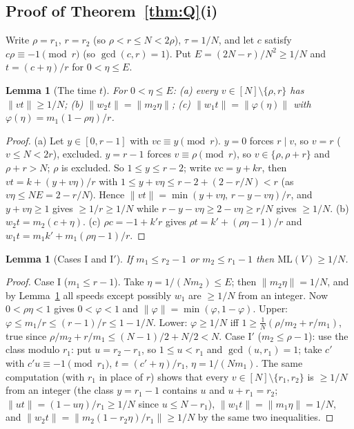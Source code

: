 \documentclass[11pt]{article}
\newtheorem{lemma}[theorem]{Lemma}
\theoremstyle{definition}
\theoremstyle{remark}
\newcommand{\nd}[1]{\lVert #1\rVert}
\newcommand{\ML}{\mathrm{ML}}
\begin{document}
\subsection{Proof of Theorem~\ref{thm:Q}(i)}
Write $\rho=r_1$, $r=r_2$ (so $\rho<r\le N<2\rho$), $\tau=1/N$, and let $c$ satisfy $c\rho\equiv-1\pmod r$ (so $\gcd(c,r)=1$). Put $E=(2N-r)/N^2\ge1/N$ and $t=(c+\eta)/r$ for $0<\eta\le E$.

\begin{lemma}[The time $t$]\label{lem:time}
For $0<\eta\le E$: (a) every $v\in[N]\setminus\{\rho,r\}$ has $\nd{vt}\ge1/N$; (b) $\nd{w_2t}=\nd{m_2\eta}$; (c) $\nd{w_1t}=\nd{\varphi(\eta)}$ with $\varphi(\eta)=m_1(1-\rho\eta)/r$.
\end{lemma}
\begin{proof}
(a) Let $y\in[0,r-1]$ with $vc\equiv y\pmod r$. $y=0$ forces $r\mid v$, so $v=r$ ($v\le N<2r$), excluded. $y=r-1$ forces $v\equiv\rho\pmod r$, so $v\in\{\rho,\rho+r\}$ and $\rho+r>N$; $\rho$ is excluded. So $1\le y\le r-2$; write $vc=y+kr$, then $vt=k+(y+v\eta)/r$ with $1\le y+v\eta\le r-2+(2-r/N)<r$ (as $v\eta\le NE=2-r/N$). Hence $\nd{vt}=\min(y+v\eta,\,r-y-v\eta)/r$, and $y+v\eta\ge1$ gives $\ge1/r\ge1/N$ while $r-y-v\eta\ge2-v\eta\ge r/N$ gives $\ge1/N$. (b) $w_2t=m_2(c+\eta)$. (c) $\rho c=-1+k'r$ gives $\rho t=k'+(\rho\eta-1)/r$ and $w_1t=m_1k'+m_1(\rho\eta-1)/r$.
\end{proof}

\begin{lemma}[Cases I and I$'$]\label{lem:caseI}
If $m_1\le r_2-1$ or $m_2\le r_1-1$ then $\ML(V)\ge1/N$.
\end{lemma}
\begin{proof}
Case I ($m_1\le r-1$). Take $\eta=1/(Nm_2)\le E$; then $\nd{m_2\eta}=1/N$, and by Lemma~\ref{lem:time} all speeds except possibly $w_1$ are $\ge1/N$ from an integer. Now $0<\rho\eta<1$ gives $0<\varphi<1$ and $\nd{\varphi}=\min(\varphi,1-\varphi)$. Upper: $\varphi\le m_1/r\le(r-1)/r\le1-1/N$. Lower: $\varphi\ge1/N$ iff $1\ge\frac1N(\rho/m_2+r/m_1)$, true since $\rho/m_2+r/m_1\le(N-1)/2+N/2<N$. Case I$'$ ($m_2\le\rho-1$): use the class modulo $r_1$: put $u=r_2-r_1$, so $1\le u<r_1$ and $\gcd(u,r_1)=1$; take $c'$ with $c'u\equiv-1\pmod{r_1}$, $t=(c'+\eta)/r_1$, $\eta=1/(Nm_1)$. The same computation (with $r_1$ in place of $r$) shows that every $v\in[N]\setminus\{r_1,r_2\}$ is $\ge1/N$ from an integer (the class $y=r_1-1$ contains $u$ and $u+r_1=r_2$; $\nd{ut}=(1-u\eta)/r_1\ge1/N$ since $u\le N-r_1$), $\nd{w_1t}=\nd{m_1\eta}=1/N$, and $\nd{w_2t}=\nd{m_2(1-r_2\eta)/r_1}\ge1/N$ by the same two inequalities.
\end{proof}
\end{document}
